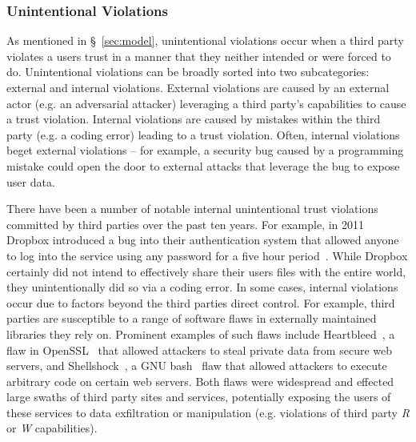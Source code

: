 \subsubsection{Unintentional Violations}

As mentioned in \S~\ref{sec:model}, unintentional violations occur
when a third party violates a users trust in a manner that they
neither intended or were forced to do. Unintentional violations can be
broadly sorted into two subcategories: external and internal
violations. External violations are caused by an external actor
(e.g. an adversarial attacker) leveraging a third party's capabilities
to cause a trust violation. Internal violations are caused by mistakes
within the third party (e.g. a coding error) leading to a trust
violation. Often, internal violations beget external violations -- for
example, a security bug caused by a programming mistake could open the
door to external attacks that leverage the bug to expose user data.

There have been a number of notable internal unintentional trust
violations committed by third parties over the past ten years. For
example, in 2011 Dropbox introduced a bug into their authentication
system that allowed anyone to log into the service using any password
for a five hour period~\cite{dropbox-authbug}. While Dropbox certainly
did not intend to effectively share their users files with the entire
world, they unintentionally did so via a coding error. In some cases,
internal violations occur due to factors beyond the third parties
direct control. For example, third parties are susceptible to a range
of software flaws in externally maintained libraries they rely
on. Prominent examples of such flaws include
Heartbleed~\cite{heartbleed}, a flaw in OpenSSL~\cite{openssl} that
allowed attackers to steal private data from secure web servers, and
Shellshock~\cite{symantec-shellshock}, a GNU bash~\cite{gnu-bash} flaw
that allowed attackers to execute arbitrary code on certain web
servers. Both flaws were widespread and effected large swaths of third
party sites and services, potentially exposing the users of these
services to data exfiltration or manipulation (e.g. violations of
third party \emph{R} or \emph{W} capabilities).

